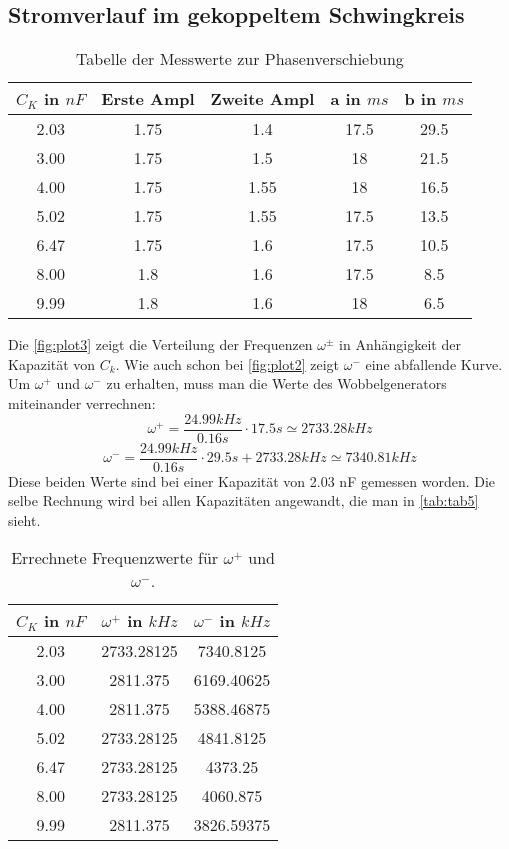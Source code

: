 \subsection{Stromverlauf im gekoppeltem Schwingkreis}

\begin{table}
  \centering
  \caption{Tabelle der Messwerte zur Phasenverschiebung}
  \label{tab:tab4}
  \begin{tabular}{c c c c c}
    \toprule
    \(C_K\) in $nF$ & Erste Ampl & Zweite Ampl & a in $ms$ & b in $ms$\\
    \midrule
    2.03 & 1.75 & 1.4 & 17.5 & 29.5\\
    3.00 & 1.75 & 1.5 & 18 & 21.5\\
    4.00 & 1.75 & 1.55 & 18 & 16.5\\
    5.02 & 1.75 & 1.55 & 17.5 & 13.5\\
    6.47 & 1.75 & 1.6 & 17.5 & 10.5\\
    8.00 & 1.8 & 1.6 & 17.5 & 8.5\\
    9.99 & 1.8 & 1.6 & 18 & 6.5\\
    \bottomrule
  \end{tabular}
\end{table}

Die \autoref{fig:plot3} zeigt die Verteilung der Frequenzen \(\omega^\pm\) in Anhängigkeit der Kapazität von \(C_k\).
Wie auch schon bei \autoref{fig:plot2} zeigt \(\omega^-\) eine abfallende Kurve.
Um \(\omega^+\) und \(\omega^-\) zu erhalten, muss man die Werte des Wobbelgenerators miteinander verrechnen:
\begin{equation}
  \omega^+ = \frac{24.99 kHz}{0.16 s}\cdot17.5 s \simeq 2733.28 kHz
\end{equation}
\begin{equation}
  \omega^- = \frac{24.99 kHz}{0.16 s}\cdot 29.5 s + 2733.28 kHz \simeq 7340.81 kHz
\end{equation}
Diese beiden Werte sind bei einer Kapazität von 2.03 nF gemessen worden.
Die selbe Rechnung wird bei allen Kapazitäten angewandt, die man in \autoref{tab:tab5} sieht.

\begin{table}
  \centering
  \caption{Errechnete Frequenzwerte für \(\omega^+\) und \(\omega^-\).}
  \label{tab:tab5}
  \begin{tabular}{c c c}
    \toprule
    \(C_K\) in $nF$ & \(\omega^+\) in $kHz$ & \(\omega^-\) in $kHz$\\
    \midrule
    2.03 & 2733.28125 & 7340.8125\\
    3.00 & 2811.375 & 6169.40625\\
    4.00 & 2811.375 & 5388.46875\\
    5.02 & 2733.28125 & 4841.8125\\
    6.47 & 2733.28125 & 4373.25\\
    8.00 & 2733.28125 & 4060.875\\
    9.99 & 2811.375 & 3826.59375\\
    \bottomrule
  \end{tabular}
\end{table}

